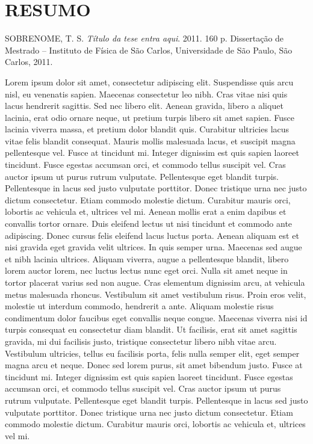 \chapter*{RESUMO}

\begin{citacaotese}
	SOBRENOME, T. S. \textit{Título da tese entra aqui}. 2011. 160 p. Dissertação de Mestrado -- Instituto de Física de São Carlos, Universidade de São Paulo, São Carlos, 2011.
\end{citacaotese}

\begin{resumo}
	Lorem ipsum dolor sit amet, consectetur adipiscing elit. Suspendisse quis arcu nisl, eu venenatis sapien. Maecenas consectetur leo nibh. Cras vitae nisi quis lacus hendrerit sagittis. Sed nec libero elit. Aenean gravida, libero a aliquet lacinia, erat odio ornare neque, ut pretium turpis libero sit amet sapien. Fusce lacinia viverra massa, et pretium dolor blandit quis. Curabitur ultricies lacus vitae felis blandit consequat. Mauris mollis malesuada lacus, et suscipit magna pellentesque vel. Fusce at tincidunt mi. Integer dignissim est quis sapien laoreet tincidunt. Fusce egestas accumsan orci, et commodo tellus suscipit vel. Cras auctor ipsum ut purus rutrum vulputate. Pellentesque eget blandit turpis. Pellentesque in lacus sed justo vulputate porttitor. Donec tristique urna nec justo dictum consectetur. Etiam commodo molestie dictum. Curabitur mauris orci, lobortis ac vehicula et, ultrices vel mi. Aenean mollis erat a enim dapibus et convallis tortor ornare. Duis eleifend lectus ut nisi tincidunt et commodo ante adipiscing. Donec cursus felis eleifend lacus luctus porta. Aenean aliquam est et nisi gravida eget gravida velit ultrices. In quis semper urna. Maecenas sed augue et nibh lacinia ultrices. Aliquam viverra, augue a pellentesque blandit, libero lorem auctor lorem, nec luctus lectus nunc eget orci. Nulla sit amet neque in tortor placerat varius sed non augue. Cras elementum dignissim arcu, at vehicula metus malesuada rhoncus. Vestibulum sit amet vestibulum risus. Proin eros velit, molestie ut interdum commodo, hendrerit a ante. Aliquam molestie risus condimentum dolor faucibus eget convallis neque congue. Maecenas viverra nisi id turpis consequat eu consectetur diam blandit. Ut facilisis, erat sit amet sagittis gravida, mi dui facilisis justo, tristique consectetur libero nibh vitae arcu. Vestibulum ultricies, tellus eu facilisis porta, felis nulla semper elit, eget semper magna arcu et neque. Donec sed lorem purus, sit amet bibendum justo. Fusce at tincidunt mi. Integer dignissim est quis sapien laoreet tincidunt. Fusce egestas accumsan orci, et commodo tellus suscipit vel. Cras auctor ipsum ut purus rutrum vulputate. Pellentesque eget blandit turpis. Pellentesque in lacus sed justo vulputate porttitor. Donec tristique urna nec justo dictum consectetur. Etiam commodo molestie dictum. Curabitur mauris orci, lobortis ac vehicula et, ultrices vel mi.
\end{resumo}

